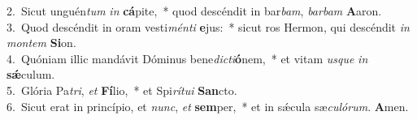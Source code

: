 {2.~}Sicut unguén\textit{tum} \textit{in} \textbf{cá}pite,~* quod descéndit in bar\textit{bam}, \textit{bar}\textit{bam} \textbf{A}aron.\\
{3.~}Quod descéndit in oram vesti\textit{mén}\textit{ti} \textbf{e}jus:~* sicut ros Hermon, qui descéndit \textit{in} \textit{mon}\textit{tem} \textbf{Si}on.\\
{4.~}Quóniam illic mandávit Dóminus bene\textit{di}\textit{cti}\textbf{ó}nem,~* et vitam \textit{us}\textit{que} \textit{in} \textbf{sǽ}culum.\\
{5.~}Glória Pa\textit{tri}, \textit{et} \textbf{Fí}lio,~* et Spi\textit{rí}\textit{tu}\textit{i} \textbf{San}cto.\\
{6.~}Sicut erat in princípio, et \textit{nunc}, \textit{et} \textbf{sem}per,~* et in sǽcula sæ\textit{cu}\textit{ló}\textit{rum}. \textbf{A}men.\\

